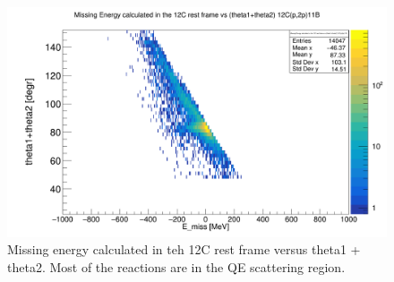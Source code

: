 \documentclass{report}
\begin{document}
\begin{figure}[!htb]
  \includegraphics[width=\linewidth]{missing_E_12C_11B_vs_theta.png}
  \caption{Missing energy calculated in teh 12C rest frame versus theta1 + theta2. Most of the reactions are in the QE scattering region.}
\end{figure}
\newline
\newpage
\end{document}
